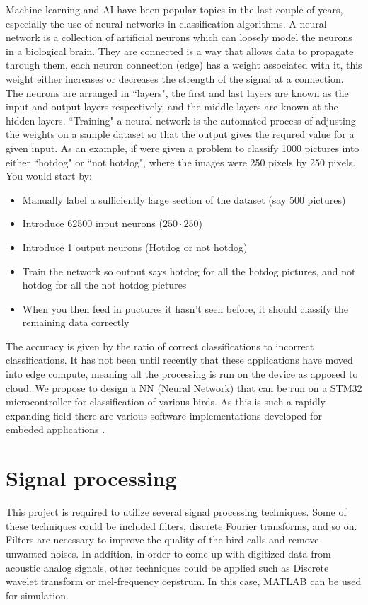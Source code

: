 \documentclass{article}
\begin{document}
Machine learning and AI have been popular topics in the last couple of years, especially the use of neural networks in classification algorithms. A neural network is a collection of artificial neurons which can loosely model the neurons in a biological brain. They are connected is a way that allows data to propagate through them, each neuron connection (edge) has a weight associated with it, this weight either increases or decreases the strength of the signal at a connection. The neurons are arranged in ``layers", the first and last layers are known as the input and output layers respectively, and the middle layers are known at the hidden layers. ``Training" a neural network is the automated process of adjusting the weights on a sample dataset so that the output gives the requred value for a given input. As an example, if were given a problem to classify 1000 pictures into either ``hotdog" or ``not hotdog", where the images were 250 pixels by 250 pixels. You would start by:

\begin{itemize}
\item Manually label a sufficiently large section of the dataset (say 500 pictures)
\item Introduce 62500 input neurons ($250 \cdot 250$)  
\item Introduce 1 output neurons (Hotdog or not hotdog)  
\item Train the network so output says hotdog for all the hotdog pictures, and not hotdog for all the not hotdog pictures
\item When you then feed in puctures it hasn't seen before, it should classify the remaining data correctly
\end{itemize}

The accuracy is given by the ratio of correct classifications to incorrect classifications. It has not been until recently that these applications have moved into edge compute, meaning all the processing is run on the device as apposed to cloud. We propose to design a NN (Neural Network) that can be run on a STM32 microcontroller for classification of various birds. As this is such a rapidly expanding field there are various software implementations developed for embeded applications \cite{CMSIS} \cite{TF}. 

\section{Signal processing}
This project is required to utilize several signal processing techniques. Some of these techniques could be included filters, discrete Fourier transforms, and so on. Filters are necessary to improve the quality of the bird calls and remove unwanted noises. In addition, in order to come up with digitized data from acoustic analog signals, other techniques could be applied such as Discrete wavelet transform or mel-frequency cepstrum. In this case, MATLAB can be used for simulation.
\end{document}
